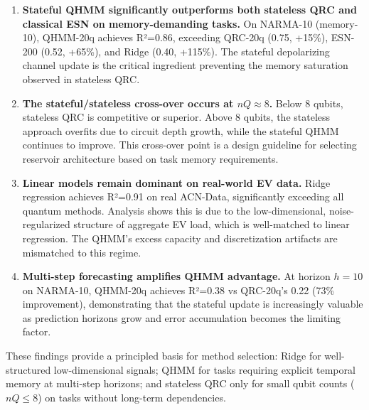 \begin{enumerate}
  \item \textbf{Stateful QHMM significantly outperforms both stateless QRC
    and classical ESN on memory-demanding tasks.} On NARMA-10 (memory-10),
    QHMM-20q achieves R²=0.86, exceeding QRC-20q (0.75, +15\%),
    ESN-200 (0.52, +65\%), and Ridge (0.40, +115\%). The stateful
    depolarizing channel update is the critical ingredient preventing
    the memory saturation observed in stateless QRC.


  \item \textbf{The stateful/stateless cross-over occurs at $nQ \approx 8$.}
    Below 8 qubits, stateless QRC is competitive or superior. Above 8
    qubits, the stateless approach overfits due to circuit depth growth,
    while the stateful QHMM continues to improve. This cross-over point
    is a design guideline for selecting reservoir architecture based on
    task memory requirements.


  \item \textbf{Linear models remain dominant on real-world EV data.}
    Ridge regression achieves R²=0.91 on real ACN-Data, significantly
    exceeding all quantum methods. Analysis shows this is due to the
    low-dimensional, noise-regularized structure of aggregate EV load,
    which is well-matched to linear regression. The QHMM's excess
    capacity and discretization artifacts are mismatched to this regime.


  \item \textbf{Multi-step forecasting amplifies QHMM advantage.}
    At horizon $h=10$ on NARMA-10, QHMM-20q achieves R²=0.38 vs
    QRC-20q's 0.22 (73\% improvement), demonstrating that the stateful
    update is increasingly valuable as prediction horizons grow and
    error accumulation becomes the limiting factor.

\end{enumerate}


These findings provide a principled basis for method selection:
Ridge for well-structured low-dimensional signals; QHMM for tasks
requiring explicit temporal memory at multi-step horizons; and stateless
QRC only for small qubit counts ($nQ \leq 8$) on tasks without
long-term dependencies.
